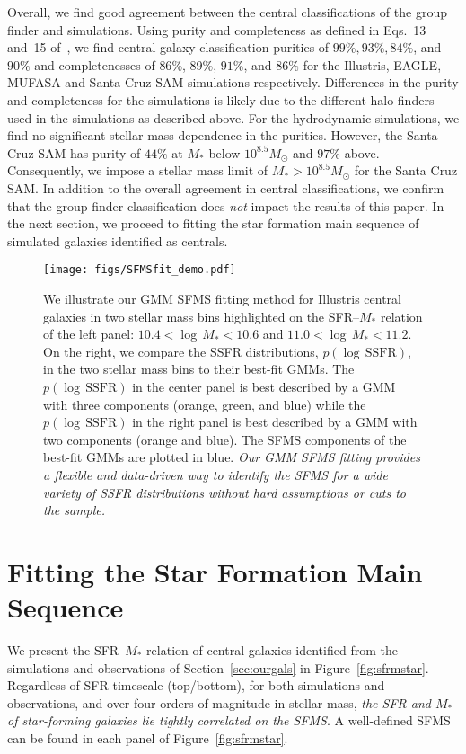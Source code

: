 \documentclass[preprint2,tighten]{aastex62}
\begin{document}
Overall, we find good agreement between the central classifications of 
the group finder and simulations. Using purity and completeness as defined 
in Eqs.~13 and~15 of~\cite{campbell2015}, we find central galaxy classification purities of 
$99\%, 93\%, 84\%$, and $90\%$ and completenesses of $86\%$, $89\%$, 
$91\%$, and $86\%$  for the Illustris, EAGLE, MUFASA and Santa Cruz SAM 
simulations respectively. Differences in the purity and completeness for the 
simulations is likely due to the different halo finders used in the 
simulations as described above. For the hydrodynamic simulations, we find no 
significant stellar mass dependence in the purities. However, the Santa 
Cruz SAM has purity of $44\%$ at $M_*$ below $10^{8.5}M_\odot$ and $97\%$ 
above. Consequently, we impose a stellar mass limit of $M_* > 10^{8.5} M_\odot$
for the Santa Cruz SAM. In addition to the overall agreement in central 
classifications, we confirm that the group finder classification does \emph{not} 
impact the results of this paper. In the next section, we proceed to fitting 
the star formation main sequence of simulated galaxies identified as centrals.


\begin{figure*}
\begin{center}
\texttt{[image: figs/SFMSfit\_demo.pdf]} 
\caption{
We illustrate our GMM SFMS fitting method for Illustris central galaxies in two 
stellar mass bins highlighted on the SFR--$M_*$ relation of the left panel: 
$10.4 < \log\,M_* < 10.6$ and $11.0 < \log\,M_* < 11.2$. On the right, we compare the SSFR 
distributions, $p(\log\,\mathrm{SSFR})$, in the two stellar 
mass bins to their best-fit GMMs. The $p(\log\,\mathrm{SSFR})$ in the center panel is best described by a 
GMM with three components (orange, green, and blue) while the
$p(\log\,\mathrm{SSFR})$ in the right panel is best described by 
a GMM with two components (orange and blue). The SFMS components of the 
best-fit GMMs are plotted in blue. \emph{Our GMM SFMS fitting provides
a flexible and data-driven way to identify the SFMS for a wide variety 
of SSFR distributions without hard assumptions or cuts to the sample.}
}\label{fig:fitdemo}
\end{center}
\end{figure*}

\section{Fitting the Star Formation Main Sequence}\label{sec:sfmsfit}
We present the SFR--$M_*$ relation of central galaxies identified 
from the simulations and observations of Section~\ref{sec:ourgals} in 
Figure~\ref{fig:sfrmstar}. Regardless of SFR timescale (top/bottom),
for both simulations and observations, and over four orders of magnitude 
in stellar mass, \emph{the SFR and $M_*$ of star-forming galaxies lie 
tightly correlated on the SFMS}. A well-defined SFMS can be found in 
each panel of Figure~\ref{fig:sfrmstar}.
\end{document}
